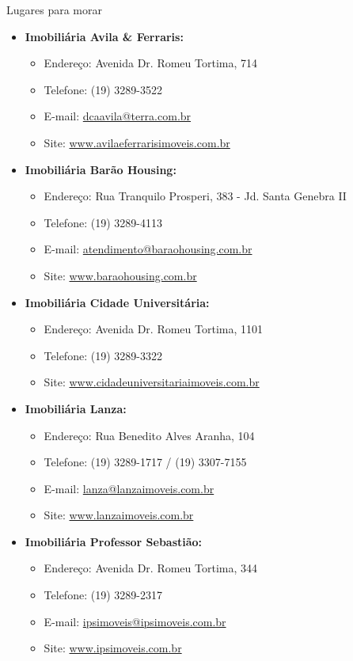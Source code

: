 \begin{story}{Lugares para morar}
\begin{itemize}
\item \textbf{Imobiliária Avila \& Ferraris:}
\begin{itemize}
\item Endereço: Avenida Dr. Romeu Tortima, 714
\item Telefone: (19) 3289-3522
\item E-mail: \url{dcaavila@terra.com.br}
\item Site: \url{www.avilaeferrarisimoveis.com.br}
\end{itemize}

\item \textbf{Imobiliária Barão Housing:}
\begin{itemize}
\item Endereço: Rua Tranquilo Prosperi, 383 - Jd. Santa Genebra II
\item Telefone: (19) 3289-4113
\item E-mail: \url{atendimento@baraohousing.com.br}
\item Site: \url{www.baraohousing.com.br}
\end{itemize}

\item \textbf{Imobiliária Cidade Universitária:}
\begin{itemize}
\item Endereço: Avenida Dr. Romeu Tortima, 1101
\item Telefone: (19) 3289-3322
\item Site: \url{www.cidadeuniversitariaimoveis.com.br}
\end{itemize}

\item \textbf{Imobiliária Lanza:}
\begin{itemize}
\item Endereço: Rua Benedito Alves Aranha, 104
\item Telefone: (19) 3289-1717 / (19) 3307-7155
\item E-mail: \url{lanza@lanzaimoveis.com.br}
\item Site: \url{www.lanzaimoveis.com.br}
\end{itemize}

\item \textbf{Imobiliária Professor Sebastião:}
\begin{itemize}
\item Endereço: Avenida Dr. Romeu Tortima, 344
\item Telefone: (19) 3289-2317
\item E-mail: \url{ipsimoveis@ipsimoveis.com.br}
\item Site: \url{www.ipsimoveis.com.br}
\end{itemize}


\end{itemize}
\end{story}
